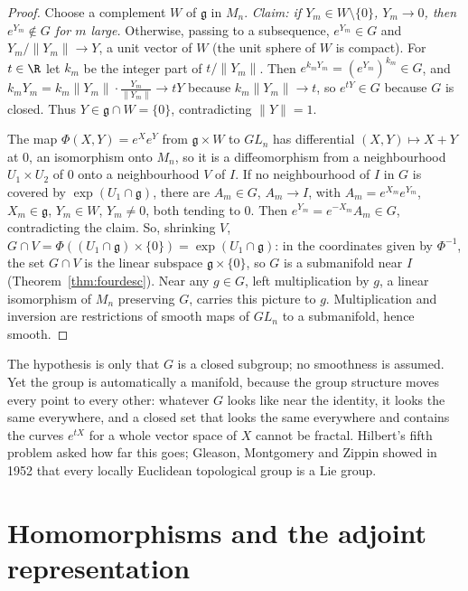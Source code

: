 \begin{proof}
Choose a complement $W$ of $\mathfrak g$ in $M_n$. \emph{Claim: if $Y_m\in W\setminus\{0\}$, $Y_m\to0$, then $e^{Y_m}\notin G$ for $m$ large.} Otherwise, passing to a subsequence, $e^{Y_m}\in G$ and $Y_m/\|Y_m\|\to Y$, a
unit vector of $W$ (the unit sphere of $W$ is compact). For $t\in\R$ let $k_m$ be the integer part of $t/\|Y_m\|$. Then $e^{k_mY_m}=(e^{Y_m})^{k_m}\in G$, and $k_mY_m=k_m\|Y_m\|\cdot\frac{Y_m}{\|Y_m\|}\to tY$ because $k_m\|Y_m\|\to t$, so
$e^{tY}\in G$ because $G$ is closed. Thus $Y\in\mathfrak g\cap W=\{0\}$, contradicting $\|Y\|=1$.

The map $\Phi(X,Y)=e^Xe^Y$ from $\mathfrak g\times W$ to $GL_n$ has differential $(X,Y)\mapsto X+Y$ at $0$, an isomorphism onto $M_n$, so it is a diffeomorphism from a neighbourhood $U_1\times U_2$ of $0$
onto a neighbourhood $V$ of $I$. If no neighbourhood of $I$ in $G$ is covered by $\exp(U_1\cap\mathfrak g)$, there are $A_m\in G$, $A_m\to I$, with $A_m=e^{X_m}e^{Y_m}$, $X_m\in\mathfrak g$, $Y_m\in W$, $Y_m\ne0$, both tending to
$0$. Then $e^{Y_m}=e^{-X_m}A_m\in G$, contradicting the claim. So, shrinking $V$, $G\cap V=\Phi((U_1\cap\mathfrak g)\times\{0\})=\exp(U_1\cap\mathfrak g)$: in the coordinates given by $\Phi^{-1}$, the set $G\cap V$ is the
linear subspace $\mathfrak g\times\{0\}$, so $G$ is a submanifold near $I$ (Theorem~\ref{thm:fourdesc}). Near any $g\in G$, left multiplication by $g$, a linear isomorphism of $M_n$ preserving $G$, carries this
picture to $g$. Multiplication and inversion are restrictions of smooth maps of $GL_n$ to a submanifold, hence smooth.
\end{proof}

\begin{beauty}
The hypothesis is only that $G$ is a closed subgroup; no smoothness is assumed. Yet the group is automatically a manifold, because the group structure moves every point to every other:
whatever $G$ looks like near the identity, it looks the same everywhere, and a closed set that looks the same everywhere and contains the curves $e^{tX}$ for a whole vector space of $X$ cannot
be fractal. Hilbert's fifth problem asked how far this goes; Gleason, Montgomery and Zippin showed in 1952 that every locally Euclidean topological group is a Lie group.
\end{beauty}

\section{Homomorphisms and the adjoint representation}

